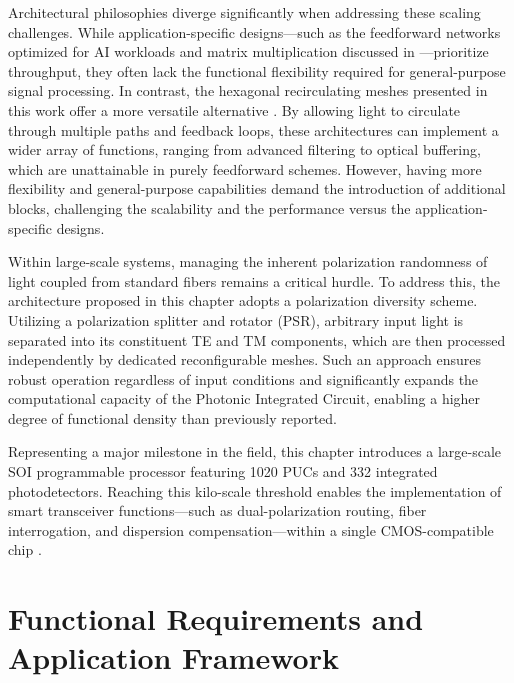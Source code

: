 Architectural philosophies diverge significantly when addressing these scaling challenges. While 
application-specific designs—such as the feedforward networks optimized for AI workloads and matrix 
multiplication discussed in 
\cite{shenDeepLearningCoherent2017,}—prioritize throughput, they often lack the functional 
flexibility required for general-purpose signal processing. In contrast, the hexagonal 
recirculating meshes presented in this work offer a more versatile alternative 
\cite{perezMultipurposeSiliconPhotonics2017, bogaertsProgrammablePhotonicCircuits2020}. By 
allowing light to circulate through multiple paths and feedback loops, these architectures can 
implement a wider array of functions, ranging from advanced filtering to optical buffering, which 
are unattainable in purely feedforward schemes. However, having more flexibility and 
general-purpose capabilities demand the introduction of additional blocks, challenging the 
scalability and the performance versus the application-specific designs.

Within large-scale systems, managing the inherent polarization randomness of light coupled from 
standard fibers remains a critical hurdle. To address this, the architecture proposed in this 
chapter adopts a polarization diversity \cite{fukudaSiliconPhotonicCircuit2008, 
daiPolarizationManagementSilicon2013, tanizawaNovelPolarizationDiversity2016} scheme. Utilizing a 
polarization splitter and rotator (PSR), arbitrary input light is separated into its constituent TE 
and TM components, which are then processed independently by dedicated reconfigurable meshes. Such 
an approach ensures robust operation regardless of input conditions and significantly expands the 
computational capacity of the Photonic Integrated Circuit, enabling a higher degree of functional 
density than previously reported.

Representing a major milestone in the field, this chapter introduces a large-scale 
SOI programmable processor featuring 1020 PUCs and 332 integrated photodetectors. Reaching this 
kilo-scale threshold enables the implementation of smart transceiver functions—such as 
dual-polarization routing, fiber interrogation, and dispersion compensation—within a single 
CMOS-compatible chip \cite{Santome2026_ECIO}.



\section{Functional Requirements and Application Framework}
\label{sec:smart_transceiver}

